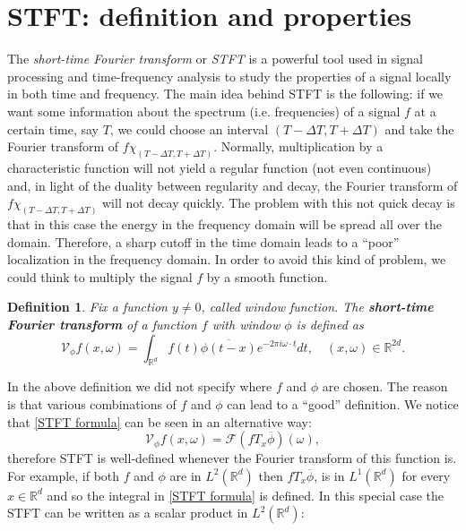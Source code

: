 \documentclass[corpo=11pt, stile=classica, tipotesi=custom,
greek, evenboxes, english]{toptesi}
\numberwithin{equation}{chapter}
\newtheorem{defi}[teo]{Definition}
\theoremstyle{definition}
\theoremstyle{remark}
\newcommand{\R}{\mathbb{R}} %
\newcommand{\V}{\mathcal{V}} %
\newcommand{\F}{\mathscr{F}} %
\begin{document}
\section{STFT: definition and properties}\label{section STFT}
The \emph{short-time Fourier transform} or \emph{STFT} is a powerful tool used in signal processing and time-frequency analysis to study the properties of a signal locally in both time and frequency. The main idea behind STFT is the following: if we want some information about the spectrum (i.e. frequencies) of a signal $f$ at a certain time, say $T$, we could choose an interval $(T-\Delta T, T + \Delta T)$ and take the Fourier transform of $f \chi_{(T-\Delta T, T + \Delta T)}$. Normally, multiplication by a characteristic function will not yield a regular function (not even continuous) and, in light of the duality between regularity and decay, the Fourier transform of $f \chi_{(T-\Delta T, T + \Delta T)}$ will not decay quickly. The problem with this not quick decay is that in this case the energy in the frequency domain will be spread all over the domain. Therefore, a sharp cutoff in the time domain leads to a ``poor'' localization in the frequency domain. In order to avoid this kind of problem, we could think to multiply the signal $f$ by a smooth function.
\begin{defi}\label{STFT def}
	Fix a function $y \neq 0$, called \emph{window function}. The \textbf{short-time Fourier transform} of a function $f$ with window $\phi$ is defined as
	\begin{equation}\label{STFT formula}
		\V_{\phi}f(x,\omega) = \int_{\R^d} f(t)\overline{\phi(t-x)}e^{-2 \pi i \omega \cdot t} dt, \quad (x,\omega) \in \R^{2d}.
	\end{equation}
\end{defi}
In the above definition we did not specify where $f$ and $\phi$ are chosen. The reason is that various combinations of $f$ and $\phi$ can lead to a ``good'' definition. We notice that \eqref{STFT formula} can be seen in an alternative way:
\begin{equation}\label{STFT formula as Fourier transform}
	\V_{\phi} f(x, \omega) = \F(f T_x \overline{\phi})(\omega),
\end{equation}
therefore STFT is well-defined whenever the Fourier transform of this function is. For example, if both $f$ and $\phi$ are in $L^2(\R^d)$ then $f T_x\overline{\phi}$, is in $L^1(\R^d)$ for every $x \in \R^d$ and so the integral in \eqref{STFT formula} is defined. In this special case the STFT can be written as a scalar product in $L^2(\R^d)$:
\end{document}
